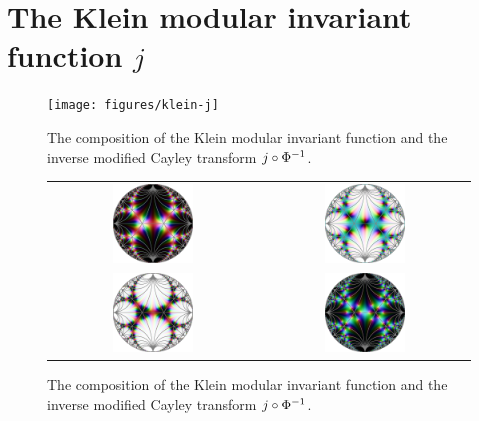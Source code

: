 \section{The Klein modular invariant function $j$}

\begin{figure}
\centering
\texttt{[image: figures/klein-j]}
\caption{The composition of the Klein modular invariant function and the inverse modified Cayley transform $j \circ {\Phi}^{-1}$.}
\label{fig_KleinJ}
\end{figure}

\begin{figure}
\centering
\begin{tabular}{c c}
\includegraphics[width=0.4\textwidth]{figures/klein-jinv} &
\includegraphics[width=0.4\textwidth]{figures/klein-jm1} \\
\includegraphics[width=0.4\textwidth]{figures/klein-jsqr} &
\includegraphics[width=0.4\textwidth]{figures/klein-jfib}
\end{tabular}
\caption{The composition of the Klein modular invariant function and the inverse modified Cayley transform $j \circ {\Phi}^{-1}$.}
\label{fig_FunctionsOfJ}
\end{figure}
